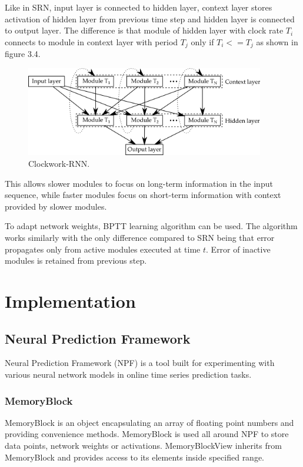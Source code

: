 \documentclass[12pt,oneside]{fithesis2}
\begin{document}
Like in SRN, input layer is connected to hidden layer, context layer stores activation of hidden layer from previous time step and hidden layer is connected to output layer. The difference is that module of hidden layer with clock rate $T_i$ connects to module in context layer with period $T_j$ only if $T_i <= T_j$ as shown in figure 3.4.
	\begin{figure}[ht]
		\centering
		\includegraphics[width=394px]{cw-rnn.png}
		\caption{Clockwork-RNN. }
	\end{figure}
This allows slower modules to focus on long-term information in the input sequence, while faster modules focus on short-term information with context provided by slower modules. \par

To adapt network weights, BPTT learning algorithm can be used. The algorithm works similarly with the only difference compared to SRN being that error propagates only from active modules executed at time $t$. Error of inactive modules is retained from previous step. \par
      
\chapter{Implementation}
\section{Neural Prediction Framework}
Neural Prediction Framework (NPF) is a tool built for experimenting with various neural network models in online time series prediction tasks.

\subsection{MemoryBlock}
MemoryBlock is an object encapsulating an array of floating point numbers and providing convenience methods. MemoryBlock is used all around NPF to store data points, network weights or activations. MemoryBlockView inherits from MemoryBlock and provides access to its elements inside specified range.
\end{document}
